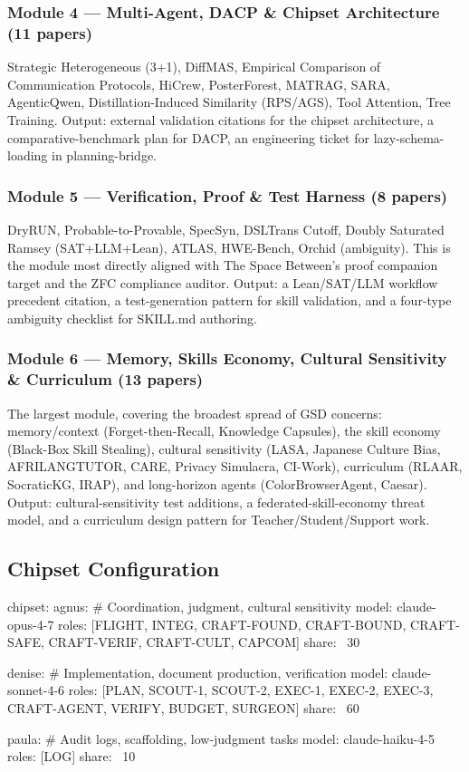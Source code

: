 \documentclass[11pt,letterpaper]{article}
\begin{document}
\subsubsection{Module 4 --- Multi-Agent, DACP \& Chipset Architecture (11 papers)}

Strategic Heterogeneous (3+1), DiffMAS, Empirical Comparison of Communication Protocols, HiCrew, PosterForest, MATRAG, SARA, AgenticQwen, Distillation-Induced Similarity (RPS/AGS), Tool Attention, Tree Training. Output: external validation citations for the chipset architecture, a comparative-benchmark plan for DACP, an engineering ticket for lazy-schema-loading in planning-bridge.

\subsubsection{Module 5 --- Verification, Proof \& Test Harness (8 papers)}

DryRUN, Probable-to-Provable, SpecSyn, DSLTrans Cutoff, Doubly Saturated Ramsey (SAT+LLM+Lean), ATLAS, HWE-Bench, Orchid (ambiguity). This is the module most directly aligned with The Space Between's proof companion target and the ZFC compliance auditor. Output: a Lean/SAT/LLM workflow precedent citation, a test-generation pattern for skill validation, and a four-type ambiguity checklist for SKILL.md authoring.

\subsubsection{Module 6 --- Memory, Skills Economy, Cultural Sensitivity \& Curriculum (13 papers)}

The largest module, covering the broadest spread of GSD concerns: memory/context (Forget-then-Recall, Knowledge Capsules), the skill economy (Black-Box Skill Stealing), cultural sensitivity (LASA, Japanese Culture Bias, AFRILANGTUTOR, CARE, Privacy Simulacra, CI-Work), curriculum (RLAAR, SocraticKG, IRAP), and long-horizon agents (ColorBrowserAgent, Caesar). Output: cultural-sensitivity test additions, a federated-skill-economy threat model, and a curriculum design pattern for Teacher/Student/Support work.

\subsection{Chipset Configuration}

\begin{asciibox}
chipset:
  agnus:    # Coordination, judgment, cultural sensitivity
    model: claude-opus-4-7
    roles: [FLIGHT, INTEG, CRAFT-FOUND, CRAFT-BOUND,
            CRAFT-SAFE, CRAFT-VERIF, CRAFT-CULT, CAPCOM]
    share: ~30%

  denise:   # Implementation, document production, verification
    model: claude-sonnet-4-6
    roles: [PLAN, SCOUT-1, SCOUT-2,
            EXEC-1, EXEC-2, EXEC-3,
            CRAFT-AGENT, VERIFY, BUDGET, SURGEON]
    share: ~60%

  paula:    # Audit logs, scaffolding, low-judgment tasks
    model: claude-haiku-4-5
    roles: [LOG]
    share: ~10%
\end{asciibox}
\end{document}
